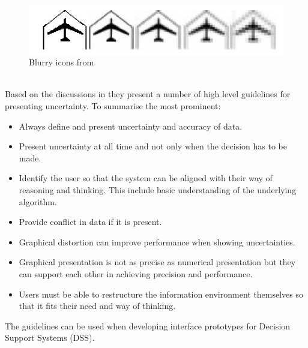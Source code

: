 \begin{figure}[h!]
\centering
\includegraphics[width=0.7\linewidth,natwidth=898,natheight=587]{billeder/blurryIcons.png}
\caption{Blurry icons from \cite{UncertainInformation}}
\label{fig:blurryIcons}
\end{figure}  
\\[0.5cm]
Based on the discussions in \cite{UncertainInformation} they present a number of high level guidelines for presenting uncertainty. To summarise the most prominent:
\begin{itemize}
\item Always define and present uncertainty and accuracy of data.
\item Present uncertainty at all time and not only when the decision has to be made.
\item Identify the user so that the system can be aligned with their way of reasoning and thinking. This include basic understanding of the underlying algorithm.
\item Provide conflict in data if it is present.
\item Graphical distortion can improve performance when showing uncertainties.
\item Graphical presentation is not as precise as numerical presentation but they can support each other in achieving precision and performance.
\item Users must be able to restructure the information environment themselves so that it fits their need and way of thinking.
\end{itemize}
The guidelines can be used when developing interface prototypes for Decision Support Systems (DSS).